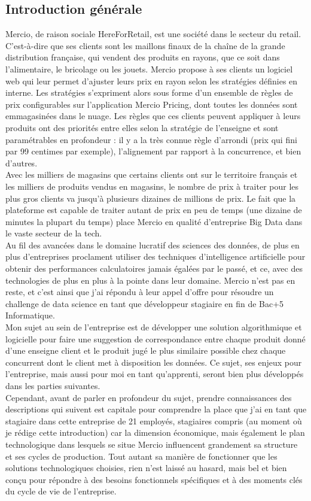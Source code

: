 \documentclass{rapportCS}
\begin{document}
\subsection{Introduction générale}
Mercio, de raison sociale HereForRetail, est une société dans le secteur du retail. 
C'est-à-dire que ses clients sont les maillons finaux de la chaîne de la grande distribution 
française, qui vendent des produits en rayons, que ce soit dans l'alimentaire, le bricolage 
ou les jouets. Mercio propose à ses clients un logiciel web qui leur permet d'ajuster leurs prix 
en rayon selon les stratégies définies en interne. Les stratégies s'expriment alors sous forme 
d'un ensemble de règles de prix configurables sur l'application Mercio Pricing, dont toutes les 
données sont emmagasinées dans le nuage. Les règles que ces clients peuvent appliquer à leurs 
produits ont des priorités entre elles selon la stratégie de l'enseigne et sont paramétrables en 
profondeur : il y a la très connue règle d'arrondi (prix qui fini par 99 centimes par exemple), 
l'alignement par rapport à la concurrence, et bien d'autres. \\
Avec les milliers de magasins que certains clients ont sur le territoire français et les milliers 
de produits vendus en magasins, le nombre de prix à traiter pour les plus gros clients va jusqu'à 
plusieurs dizaines de millions de prix. Le fait que la plateforme est capable de traiter autant de 
prix en peu de temps (une dizaine de minutes la plupart du temps) place Mercio en qualité 
d'entreprise Big Data dans le vaste secteur de la tech.\\
Au fil des avancées dans le domaine lucratif des sciences des données, de plus en plus 
d'entreprises proclament utiliser des techniques d'intelligence artificielle pour obtenir des 
performances calculatoires jamais égalées par le passé, et ce, avec des technologies de plus en plus
à la pointe dans leur domaine. 
Mercio n'est pas en reste, et c'est ainsi que j'ai répondu à leur appel
d'offre pour résoudre un challenge de data science en tant que développeur stagiaire en fin de 
Bac+5 Informatique.\\
Mon sujet au sein de l'entreprise est de développer une solution algorithmique et logicielle pour 
faire une suggestion de correspondance entre chaque produit donné d'une enseigne client et le 
produit jugé le plus similaire possible chez chaque concurrent 
dont le client met à disposition les données. 
Ce sujet, ses enjeux pour l'entreprise, mais aussi pour moi en tant qu'apprenti,
seront bien plus développés dans les parties suivantes.\\
Cependant, avant de parler en profondeur du sujet, prendre connaissances des descriptions qui
suivent est capitale pour comprendre la place que j'ai en tant que stagiaire dans cette 
entreprise de 21 employés, stagiaires compris (au moment où je rédige cette introduction) car la
dimension économique, mais également le plan technologique dans lesquels se situe Mercio influencent 
grandement sa structure et ses cycles de production. Tout autant sa manière de fonctionner que les 
solutions technologiques choisies, rien n'est laissé au hasard, mais bel et bien conçu pour 
répondre à des besoins fonctionnels spécifiques et à des moments clés du cycle de vie de 
l'entreprise.
\end{document}
